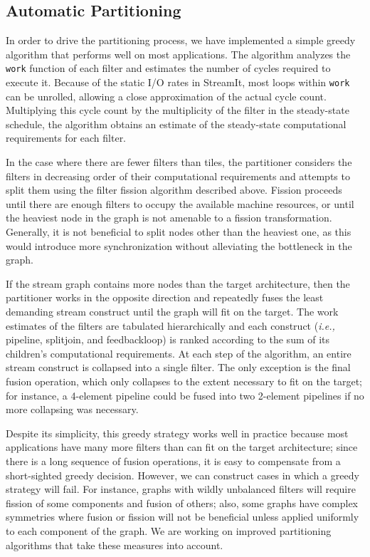 \subsection{Automatic Partitioning}

In order to drive the partitioning process, we have implemented a
simple greedy algorithm that performs well on most applications.  The
algorithm analyzes the {\tt work} function of each filter and
estimates the number of cycles required to execute it.  Because of the
static I/O rates in StreamIt, most loops within {\tt work} can be
unrolled, allowing a close approximation of the actual cycle count.
Multiplying this cycle count by the multiplicity of the filter in the
steady-state schedule, the algorithm obtains an estimate of the
steady-state computational requirements for each filter.

In the case where there are fewer filters than tiles, the partitioner
considers the filters in decreasing order of their computational
requirements and attempts to split them using the filter fission
algorithm described above.  Fission proceeds until there are enough
filters to occupy the available machine resources, or until the
heaviest node in the graph is not amenable to a fission
transformation.  Generally, it is not beneficial to split nodes other
than the heaviest one, as this would introduce more synchronization
without alleviating the bottleneck in the graph.

If the stream graph contains more nodes than the target architecture,
then the partitioner works in the opposite direction and repeatedly
fuses the least demanding stream construct until the graph will fit on
the target.  The work estimates of the filters are tabulated
hierarchically and each construct ({\it i.e.,} pipeline, splitjoin,
and feedbackloop) is ranked according to the sum of its children's
computational requirements.  At each step of the algorithm, an entire
stream construct is collapsed into a single filter.  The only
exception is the final fusion operation, which only collapses to the
extent necessary to fit on the target; for instance, a 4-element
pipeline could be fused into two 2-element pipelines if no more
collapsing was necessary.

Despite its simplicity, this greedy strategy works well in practice
because most applications have many more filters than can fit on the
target architecture; since there is a long sequence of fusion
operations, it is easy to compensate from a short-sighted greedy
decision.  However, we can construct cases in which a greedy strategy
will fail.  For instance, graphs with wildly unbalanced filters will
require fission of some components and fusion of others; also, some
graphs have complex symmetries where fusion or fission will not be
beneficial unless applied uniformly to each component of the graph.
We are working on improved partitioning algorithms that take these
measures into account.
